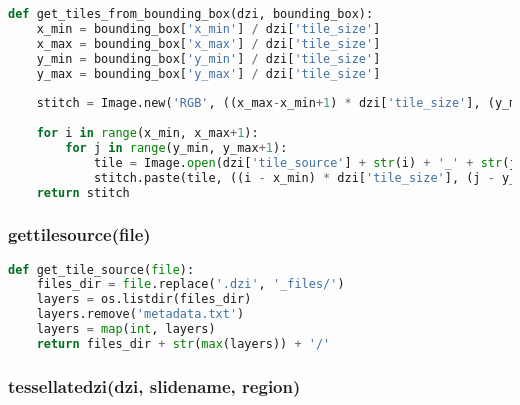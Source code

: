 \begin{lstlisting}[frame=single,language=python]
def get_tiles_from_bounding_box(dzi, bounding_box):
	x_min = bounding_box['x_min'] / dzi['tile_size']
	x_max = bounding_box['x_max'] / dzi['tile_size']
	y_min = bounding_box['y_min'] / dzi['tile_size']
	y_max = bounding_box['y_max'] / dzi['tile_size']
	
	stitch = Image.new('RGB', ((x_max-x_min+1) * dzi['tile_size'], (y_max-y_min+1) * dzi['tile_size']))
	
	for i in range(x_min, x_max+1):
		for j in range(y_min, y_max+1):
			tile = Image.open(dzi['tile_source'] + str(i) + '_' + str(j) + '.' + dzi['format'])
			stitch.paste(tile, ((i - x_min) * dzi['tile_size'], (j - y_min) * dzi['tile_size']))
	return stitch
\end{lstlisting}


\subsubsection{get{\textunderscore}tile{\textunderscore}source(file)}

\begin{lstlisting}[frame=single,language=python]
def get_tile_source(file):
	files_dir = file.replace('.dzi', '_files/')
	layers = os.listdir(files_dir)
	layers.remove('metadata.txt')
	layers = map(int, layers)
	return files_dir + str(max(layers)) + '/'
\end{lstlisting}


\subsubsection{tessellate{\textunderscore}dzi(dzi, slide{\textunderscore}name, region)}

